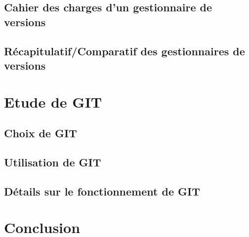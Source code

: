 \subsection{Cahier des charges d'un gestionnaire de versions}



\subsection{Récapitulatif/Comparatif des gestionnaires de versions}


\section{Etude de GIT}

\subsection{Choix de GIT}

\subsection{Utilisation de GIT}

\subsection{Détails sur le fonctionnement de GIT}

\section*{Conclusion}



